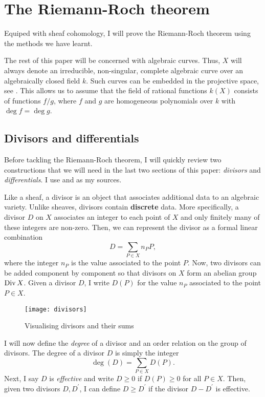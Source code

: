 \section{The Riemann-Roch theorem}
Equiped with sheaf cohomology, I will prove the Riemann-Roch theorem
using the methods we have learnt.
\begin{lnote}
  The rest of this paper will be concerned with algebraic curves. Thus,
  $X$ will always denote an irreducible, non-singular, complete algebraic
  curve over an algebraically closed field $k$. Such curves can be embedded
  in the projective space, see \cite{serre}. This allows us to assume that
  the field of rational functions $k(X)$ consists of functions $f/g$, where
  $f$ and $g$ are homogeneous polynomials over $k$ with $\deg f=\deg g$.
\end{lnote}

\subsection{Divisors and differentials}
Before tackling the Riemann-Roch theorem, I will quickly review two
constructions that we will need in the last two sections of this paper:
\emph{divisors} and \emph{differentials}. I use \cite{gathmann}
and \cite{serre} as my sources.

Like a sheaf, a divisor is an object that associates additional data to
an algebraic variety. Unlike sheaves, divisors contain \textbf{discrete}
data. More specifically, a divisor $D$ on $X$ associates an integer to
each point of $X$ and only finitely many of these integers are non-zero.
Then, we can represent the divisor as a formal linear combination
\[
  D=\sum_{P\in X}n_{P}P,
\]
where the integer $n_{P}$ is the value associated to the point $P$.
Now, two divisors can be added component by component so that divisors on
$X$ form an abelian group $\operatorname{Div} X$. Given a divisor $D$, I write $D(P)$
for the value $n_{P}$ associated to the point $P\in X$.
\begin{figure}[H]
  \centering
  \texttt{[image: divisors]}
  \caption{Visualising divisors and their sums}
\end{figure}
I will now define the \emph{degree} of a divisor and an order relation on
the group of divisors. The degree of a divisor $D$ is simply the integer
\[
  \deg(D) = \sum_{P\in X} D(P).
\]
Next, I say $D$ is \emph{effective} and write $D\geq 0$ if $D(P)\geq 0$
for all $P\in X$. Then, given two divisors $D, D^{\prime}$, I can define
$D\geq D^{\prime}$ if the divisor $D-D^{\prime}$ is effective.

